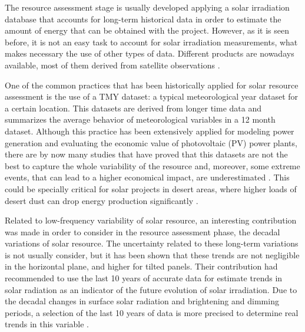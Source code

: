 The resource assessment stage is usually developed applying a solar irradiation database that accounts for long-term historical data in order to estimate the amount of energy that can be obtained with the project. However, as it is seen before, it is not an easy task to account for solar irradiation measurements, what makes necessary the use of other types of data. Different products are nowadays available, most of them derived from satellite observations \cite*{nrel}.



One of the common practices that has been historically applied for solar resource assessment is the use of a TMY dataset: a typical meteorological year dataset for a certain location. This datasets are derived from longer time data and summarizes the average behavior of meteorological variables in a 12 month dataset. Although this practice has been extensively applied for modeling power generation and evaluating the economic value of photovoltaic (PV) power plants, there are by now many studies that have proved that this datasets are not the best to capture the whole variability of the resource and, moreover, some extreme events, that can lead to a higher economical impact, are underestimated \cite*{Bryce2018, vignola2012b, nrel}. This could be specially critical for solar projects in desert areas, where higher loads of desert dust can drop energy production significantly \cite*{gueymard2014review}.


Related to low-frequency variability of solar resource, an interesting contribution was made in order to consider in the resource assessment phase, the decadal variations of solar resource. The uncertainty related to these long-term variations is not usually consider, but it has been shown that these trends are not negligible in the horizontal plane, and higher for tilted panels. Their contribution had recommended to use the last 10 years of accurate data for estimate trends in solar radiation as an indicator of the future evolution of solar irradiation. Due to the decadal changes in surface solar radiation and brightening and dimming periods, a selection of the last 10 years of data is more precised to determine real trends in this variable \cite*{muller2014rethinking}. %

